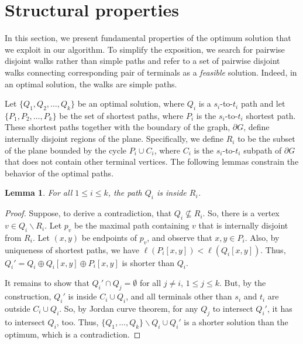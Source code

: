 \documentclass[11pt,twoside]{article}
\newtheorem{lemma}[theorem]{Lemma}
\newcommand{\spath}[1]{P_{#1}}
\newcommand{\opt}[1]{Q_{#1}}
\newcommand{\region}[1]{R_{#1}}
\newcommand{\len}[1]{\ell(#1)}
\begin{document}
\section{Structural properties}
In this section, we present fundamental properties of the optimum solution that we exploit in our algorithm.
To simplify the exposition, we search for pairwise disjoint walks rather than simple paths and refer to a set of pairwise disjoint walks connecting corresponding pair of terminals as a \emph{feasible} solution.
Indeed, in an optimal solution, the walks are simple paths.

Let $\{\opt{1}, \opt{2}, \ldots, \opt{k}\}$ be an optimal solution, where $\opt{i}$ is a $s_i$-to-$t_i$ path and let $\{\spath{1}, \spath{2}, \ldots, \spath{k}\}$ be the set of shortest paths, where $\spath{i}$ is the $s_i$-to-$t_i$ shortest path.
These shortest paths together with the boundary of the graph, $\partial G$, define internally disjoint regions of the plane.  Specifically, we define $\region{i}$ to be the subset of the plane bounded by the cycle $\spath{i} \cup C_i$, where $C_i$ is the $s_i$-to-$t_i$ subpath of $\partial G$ that does not contain other terminal vertices.
The following lemmas constrain the behavior of the optimal paths.

\begin{lemma}
\label{lem:sp_in_region}
For all $1\leq i\leq k$, the path $\opt{i}$ is inside $\region{i}$.
\end{lemma}
\begin{proof}
Suppose, to derive a contradiction, that $\opt{i} \nsubseteq \region{i}$.
So, there is a vertex $v\in \opt{i}\backslash \region{i}$.  Let $p_v$ be the maximal path containing $v$ that is internally disjoint from $\region{i}$.  Let $(x,y)$ be endpoints of $p_v$, and observe that $x,y \in \spath{i}$.  Also, by uniqueness of shortest paths, we have $\len{\spath{i}[x,y]} < \len{\opt{i}[x,y]}$.  Thus, $\opt{i}' = \opt{i} \oplus \opt{i}[x,y] \oplus \spath{i}[x,y]$ is shorter than $\opt{i}$.  

It remains to show that $\opt{i}' \cap \opt{j} = \emptyset$ for all $j \neq i$, $1\leq j\leq k$.  But, by the construction, $\opt{i}'$ is inside $C_i\cup \opt{i}$, and all terminals other than $s_i$ and $t_i$ are outside $C_i\cup \opt{i}$.  So, by Jordan curve theorem, for any $\opt{j}$ to intersect $\opt{i}'$, it has to intersect $\opt{i}$, too.  Thus, $\{\opt{1}, \ldots, \opt{k}\}\backslash \opt{i} \cup \opt{i}'$ is a shorter solution than the optimum, which is a contradiction.
\end{proof}
\end{document}
